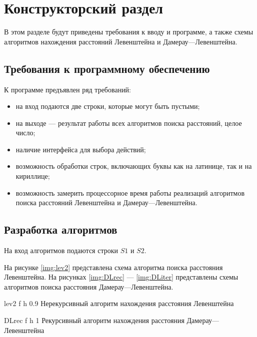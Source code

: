 \chapter{Конструкторский раздел}


В этом разделе будут приведены требования к вводу и программе, а также схемы алгоритмов нахождения расстояний Левенштейна и Дамерау---Левенштейна.

\section{Требования к программному обеспечению}

К программе предъявлен ряд требований:
\begin{itemize}
	\item на вход подаются две строки, которые могут быть пустыми;
	\item на выходе --- результат работы всех алгоритмов поиска расстояний, целое число;
	\item наличие интерфейса для выбора действий;
	\item возможность обработки строк, включающих буквы как на латинице, так и на кириллице;
	\item возможность замерить процессорное время работы реализаций алгоритмов поиска расстояний Левенштейна и Дамерау---Левенштейна.
\end{itemize}


\section{Разработка алгоритмов}

На вход алгоритмов подаются строки $S1$ и $S2$.

На рисунке \ref{img:lev2} представлена схема алгоритма поиска расстояния Левенштейна. На рисунках \ref{img:DLrec} --- \ref{img:DLiter} представлены схемы алгоритмов поиска расстояния Дамерау---Левенштейна.

{lev2} %
{f} %
{h} %
{0.9\textwidth} %
{Нерекурсивный алгоритм нахождения расстояния Левенштейна} %

{DLrec} %
{f} %
{h} %
{1\textwidth} %
{Рекурсивный алгоритм нахождения расстояния Дамерау---Левенштейна} %

